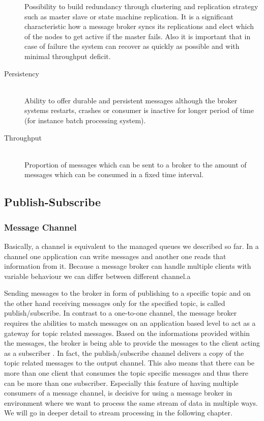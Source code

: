 \begin{description}
{            Possibility to build redundancy through clustering and
            replication strategy such as master slave or state machine
            replication. It is a significant characteristic how a
            message broker syncs its replications and elect which of the nodes
            to get active if the master fails. Also it is important that in case
            of failure the system can recover as quickly as possible and with
            minimal throughput deficit.   }
        \item [Persistency] \hfill \\ 
        {Ability to offer durable and persistent messages although the broker
            systems restarts, crashes or consumer is inactive for longer period of time
            (for instance batch processing system). }
    \item [Throughput] \hfill \\
        {Proportion of messages which can be sent to a broker to the amount of
        messages which can be consumed in a fixed time interval.}
\end{description}

\subsection{Publish-Subscribe}
\subsubsection{Message Channel}
\label{intro-messaging-publishsubscribe}

Basically, a channel is equivalent to the managed queues we described so far. In
a channel one application can write messages and another one reads that
information from it. Because a message broker can handle multiple clients with
variable behaviour we can differ between different channel.a



Sending messages to the broker in form of publishing to a specific topic and on
the other hand receiving messages only for the specified topic, is called
publish/subscribe. In contrast to a one-to-one channel, the message broker
requires the abilities to match messages on an application based level to act as
a gateway for topic related messages. Based on the informations provided within
the messages, the broker is being able to provide the messages to the client
acting as a subscriber \cite{TAN06}. In fact, the publish/subscribe channel
delivers a copy of the topic related messages to the output channel. This also
means that there can be more than one client that consumes the topic specific
messages and thus there can be more than one subscriber. Especially this feature
of having multiple consumers of a message channel, is decisive for using a
message broker in environment where we want to process the same stream of
data in multiple ways. We will go in deeper detail to stream processing in the
following chapter. \cite{EIP03}


